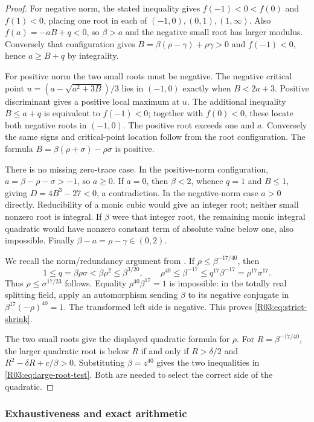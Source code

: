 \documentclass[11pt,a4paper]{article}
\theoremstyle{definition}\newtheorem{definition}[theorem]{Definition}
\theoremstyle{remark}\newtheorem{remark}[theorem]{Remark}
\begin{document}
\begin{proof}
For negative norm, the stated inequality gives
$f(-1)<0<f(0)$ and $f(1)<0$, placing one root in each of
$(-1,0),(0,1),(1,\infty)$. Also $f(a)=-aB+q<0$, so
$\beta>a$ and the negative small root has larger modulus.
Conversely that configuration gives
$B=\beta(\rho-\gamma)+\rho\gamma>0$ and
$f(-1)<0$, hence $a\ge B+q$ by integrality.

For positive norm the two small roots must be negative. The negative
critical point $u=(a-\sqrt{a^2+3B})/3$ lies in $(-1,0)$ exactly when
$B<2a+3$. Positive discriminant gives a positive local maximum at
$u$. The additional inequality $B\le a+q$ is equivalent to
$f(-1)<0$; together with $f(0)<0$, these locate both negative roots
in $(-1,0)$. The positive root exceeds one and $a$. Conversely the
same signs and critical-point location follow from the root configuration.
The formula $B=\beta(\rho+\sigma)-\rho\sigma$ is positive.

There is no missing zero-trace case. In the positive-norm configuration,
$a=\beta-\rho-\sigma>-1$, so $a\ge0$. If $a=0$, then
$\beta<2$, whence $q=1$ and $B\le1$, giving
$D=4B^3-27<0$, a contradiction. In the negative-norm case $a>0$
directly. Reducibility of a monic cubic would give an integer root;
neither small nonzero root is integral. If $\beta$ were that integer
root, the remaining monic integral quadratic would have nonzero
constant term of absolute value below one, also impossible.
Finally $\beta-a=\rho-\gamma\in(0,2)$.

We recall the norm/redundancy argument from \cite{K031}. If
$\rho\le\beta^{-17/40}$, then
\[
 1\le q=\beta\rho\sigma<\beta\rho^2\le\beta^{3/20},
 \qquad
 \rho^{40}\le\beta^{-17}\le q^{17}\beta^{-17}
 =\rho^{17}\sigma^{17}.
\]
Thus $\rho\le\sigma^{17/23}$ follows. Equality
$\rho^{40}\beta^{17}=1$ is impossible: in the totally real splitting
field, apply an automorphism sending $\beta$ to its negative conjugate
in $\beta^{17}(-\rho)^{40}=1$. The transformed left side is negative.
This proves \eqref{R03:eq:strict-shrink}.

The two small roots give the displayed quadratic formula for $\rho$.
For $R=\beta^{-17/40}$, the larger quadratic root is below $R$ if
and only if $R>\delta/2$ and $R^2-\delta R+c/\beta>0$.
Substituting $\beta=z^{40}$ gives the two inequalities in
\eqref{R03:eq:large-root-test}. Both are needed to select the correct
side of the quadratic.
\end{proof}

\subsubsection{Exhaustiveness and exact arithmetic}
\end{document}
